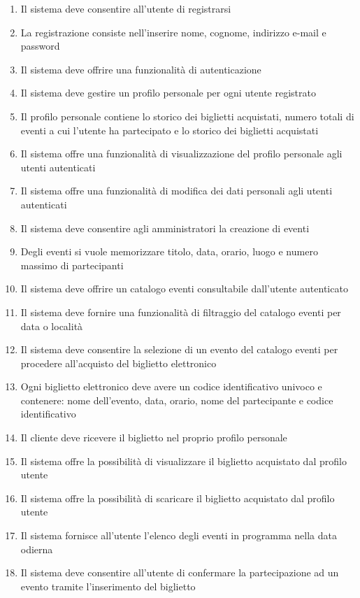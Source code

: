 \begin{enumerate}[]
    \item Il sistema deve consentire all’utente di registrarsi
    \item La registrazione consiste nell’inserire nome, cognome, indirizzo e-mail e password
    \item Il sistema deve offrire una funzionalità di autenticazione
    \item Il sistema deve gestire un profilo personale per ogni utente registrato
    \item Il profilo personale contiene lo storico dei biglietti acquistati, numero totali di eventi a cui l’utente ha partecipato e lo storico dei biglietti acquistati
    \item Il sistema offre una funzionalità di visualizzazione del profilo personale agli utenti autenticati
    \item Il sistema offre una funzionalità di modifica dei dati personali agli utenti autenticati
    \item Il sistema deve consentire agli amministratori la creazione di eventi
    \item Degli eventi si vuole memorizzare titolo, data, orario, luogo e numero massimo di partecipanti
    \item Il sistema deve offrire un catalogo eventi consultabile dall'utente autenticato
    \item Il sistema deve fornire una funzionalità di filtraggio del catalogo eventi per data o località
    \item Il sistema deve consentire la selezione di un evento del catalogo eventi per procedere all’acquisto del biglietto elettronico
    \item Ogni biglietto elettronico deve avere un codice identificativo univoco e contenere: nome dell’evento, data, orario, nome del partecipante e codice identificativo
    \item Il cliente deve ricevere il biglietto nel proprio profilo personale
    \item Il sistema offre la possibilità di visualizzare il biglietto acquistato dal profilo utente
    \item Il sistema offre la possibilità di scaricare il biglietto acquistato dal profilo utente
    \item Il sistema fornisce all’utente l’elenco degli eventi in programma nella data odierna
    \item Il sistema deve consentire all’utente di confermare la partecipazione ad un evento tramite l’inserimento del biglietto

\end{enumerate}
